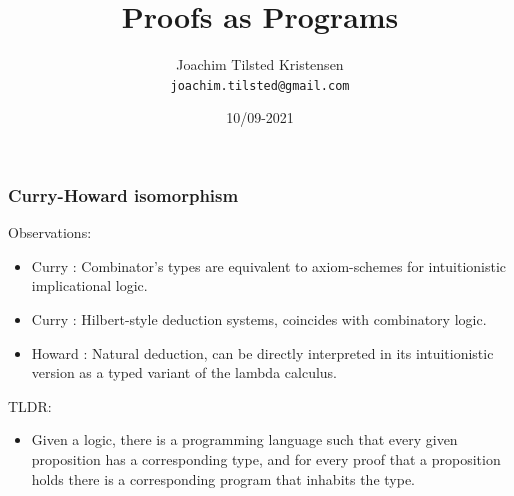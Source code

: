\documentclass[dvipsnames]{beamer}
\title{Proofs as Programs}
\author{Joachim Tilsted Kristensen\\ \texttt{joachim.tilsted@gmail.com}}
\institute{Motorola University}
\date{10/09-2021}
\begin{document}
\frame{\titlepage \vspace{-0.5cm}
}

\begin{frame}
  \frametitle{Curry-Howard isomorphism}

  \begin{block}{Observations:}
    \begin{itemize}
    \item Curry  : Combinator's types are equivalent to axiom-schemes for intuitionistic implicational logic.
    \item Curry  : Hilbert-style deduction systems, coincides with combinatory logic.
    \item Howard : Natural deduction, can be directly interpreted in its intuitionistic version as a typed variant of the lambda calculus.
    \end{itemize}
  \end{block}

  \begin{block}{TLDR:}
    \begin{itemize}
    \item Given a logic, there is a programming language such that every
      given proposition has a corresponding type, and for every proof that a
      proposition holds there is a corresponding program that inhabits the
      type.
    \end{itemize}
  \end{block}

\end{frame}


\end{document}
